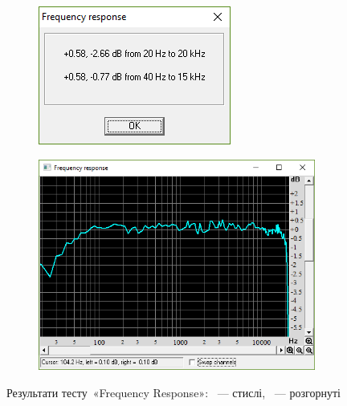 \documentclass[
	a4paper,
	oneside,
	BCOR = 10mm,
	DIV = 12,
	12pt,
	headings = normal,
]{scrartcl}
\begin{document}
			\begin{figure}[!htbp]
				\centering
				\begin{subfigure}[t]{\columnwidth / 2}
					\centering
					\includegraphics[height=08\baselineskip]{./assets/y03s02-pcdiag-lab-07-p02-01-freq.png}
					\caption{}
					\label{subfig:sca-freq}
				\end{subfigure}%
				\begin{subfigure}[t]{\columnwidth / 2}
					\centering
					\includegraphics[height=08\baselineskip]{./assets/y03s02-pcdiag-lab-07-p02-02-freq-det.png}
					\caption{}
					\label{subfig:sca-freq-det}
				\end{subfigure}
				\caption{Результати тесту~«\textenglish{Frequency Response}»: ~— стислі, ~— розгорнуті}
				\label{fig:sca-freq}
			\end{figure}
\end{document}
